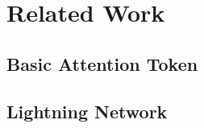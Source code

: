\chapter{Related Work}
\label{cha:relatedwork}



\section{Basic Attention Token}

\section{Lightning Network}

